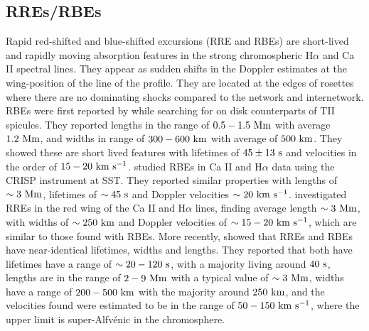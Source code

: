 \documentclass[12pt]{ociamthesis}
\newcommand{\Alfvenic}{Alfv\'{e}nic }
\newcommand{\kms}{~\rm{km ~s^{-1}}}
\newcommand{\np}{\\ \\}
\begin{document}
\subsection{RREs/RBEs}
\label{subsec:rbe}
Rapid red-shifted and blue-shifted excursions (RRE and RBEs) are short-lived and rapidly moving absorption features in the strong chromospheric H$\alpha$ and Ca II spectral lines. They appear as sudden shifts in the Doppler estimates at the wing-position of the line of the profile. They are located at the edges of rosettes where there are no dominating shocks compared to the network and internetwork. RBEs were first reported by \cite{Langangen2008ApJ} while searching for on disk counterparts of TII spicules. They reported lengths in the range of $0.5-1.5~\rm{Mm}$ with average $1.2~\rm{Mm}$, and widths in range of $300-600~\rm{km}$ with average of $500~\rm{km}$. They showed these are short lived features with lifetimes of $45\pm13~\rm{s}$ and velocities in the order of $15-20\kms$. \cite{Rouppe2009ApJ} studied RBEs in Ca II and H$\alpha$ data using the CRISP instrument at SST. They reported similar properties with lengths of $\sim 3~\rm{Mm}$, lifetimes of $\sim 45~\rm{s}$ and Doppler velocities $\sim 20\kms$. \cite{Sekse2013ApJ76944S,Sekse2013ApJ764164S} investigated RREs in the red wing of the  Ca II and H$\alpha$ lines, finding average length $\sim 3~\rm{Mm}$, with widths of $\sim 250~\rm{km}$ and Doppler velocities of $\sim 15-20\kms$, which are similar to those found with RBEs.  More recently, \cite{Kuridze2015ApJ80226K} showed that RREs and RBEs have near-identical lifetimes, widths and lengths. They reported that both have lifetimes have a range of $\sim 20-120~\rm{s}$, with a majority living around $40~\rm{s}$, lengths are in the range of $2-9~\rm{Mm}$ with a typical value of $\sim 3~\rm{Mm}$, widths have a range of $200-500~\rm{km}$ with the majority around $250~\rm{km}$, and the velocities found were estimated to be in the range of $50-150\kms$, where the upper limit is super-\Alfvenic in the chromosphere. \np
%
\end{document}
